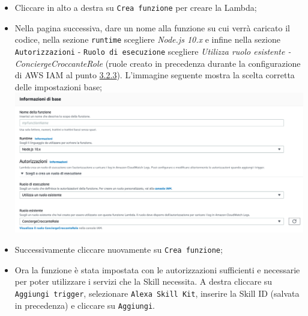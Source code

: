 \begin{itemize}
	\item Cliccare in alto a destra su \texttt{Crea funzione} per creare la Lambda;
	\item Nella pagina successiva, dare un nome alla funzione su cui verrà caricato il codice, nella sezione \texttt{runtime} scegliere \textit{Node.js 10.x} e infine nella sezione \texttt{Autorizzazioni} - \texttt{Ruolo di esecuzione} scegliere \textit{Utilizza ruolo esistente - ConciergeCroccanteRole} (ruole creato in precedenza durante la configurazione di AWS IAM al punto \hyperref[aws-iam]{3.2.3}). L'immagine seguente mostra la scelta corretta delle impostazioni base;\\[0.3cm]
	\includegraphics[width=13cm]{immagini/aws-lambda2}
	\item Successivamente cliccare nuovamente su \texttt{Crea funzione};
	\item Ora la funzione è stata impostata con le autorizzazioni sufficienti e necessarie per poter utilizzare i servizi che la Skill necessita. A destra cliccare su \texttt{Aggiungi trigger}, selezionare \texttt{Alexa Skill Kit}, inserire la Skill ID (salvata in precedenza) e cliccare su \texttt{Aggiungi}.
\end{itemize}
